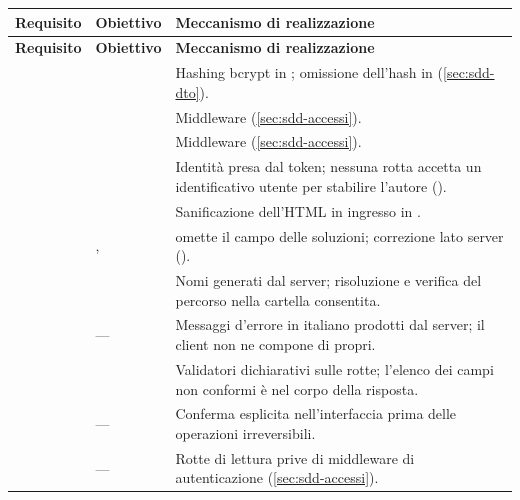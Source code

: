 \begin{longtable}{@{}l l L{9.4cm}@{}}
\toprule
\textbf{Requisito} & \textbf{Obiettivo} & \textbf{Meccanismo di realizzazione} \\
\midrule
\endfirsthead
\toprule
\textbf{Requisito} & \textbf{Obiettivo} & \textbf{Meccanismo di realizzazione} \\
\midrule
\endhead
\bottomrule
\endlastfoot

 &  &
Hashing bcrypt in ; omissione dell'hash in
 (\cref{sec:sdd-dto}). \\

 &  &
Middleware  (\cref{sec:sdd-accessi}). \\

 &  &
Middleware  (\cref{sec:sdd-accessi}). \\

 &  &
Identità presa dal token; nessuna rotta accetta un identificativo utente per
stabilire l'autore (). \\

 &  &
Sanificazione dell'HTML in ingresso in . \\

 & ,  &
 omette il campo delle soluzioni; correzione lato server
(). \\

 &  &
Nomi generati dal server; risoluzione e verifica del percorso nella cartella
consentita. \\
\midrule

 & --- &
Messaggi d'errore in italiano prodotti dal server; il client non ne compone
di propri. \\

 &  &
Validatori dichiarativi sulle rotte; l'elenco dei campi non conformi è nel
corpo della risposta. \\

 & --- &
Conferma esplicita nell'interfaccia prima delle operazioni irreversibili. \\

 & --- &
Rotte di lettura prive di middleware di autenticazione
(\cref{sec:sdd-accessi}). \\
\midrule


\end{longtable}

